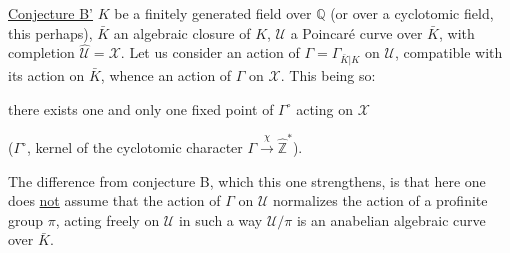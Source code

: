 \uline{Conjecture B'}  $K$ be a finitely generated field over $\mathbb{Q}$ (or over a cyclotomic field, this  perhaps), $\bar K$ an algebraic closure of $K$, $\mathcal U$ a Poincaré curve over $\bar K$, with completion $\widehat{\mathcal U}=\mathcal X$. Let us consider an action of $\Gamma=\Gamma_{\bar K|K}$ on $\mathcal U$, compatible with its action on $\bar K$, whence an action of $\Gamma$ on $\mathcal X$. This being so:

there exists one and only one fixed point of $\Gamma^\circ$ acting on $\mathcal X$

($\Gamma^\circ$, kernel of the cyclotomic character $\Gamma\xrightarrow{\chi}\widehat{\mathbb Z}^{\!*}$).

The difference from conjecture B, which this one strengthens, is that here one does \uline{not} assume that the action of $\Gamma$ on $\mathcal U$ normalizes the action of a profinite group $\pi$, acting freely on $\mathcal U$ in such a way  $\mathcal U/\pi$ is an anabelian algebraic curve over $\bar K$.
